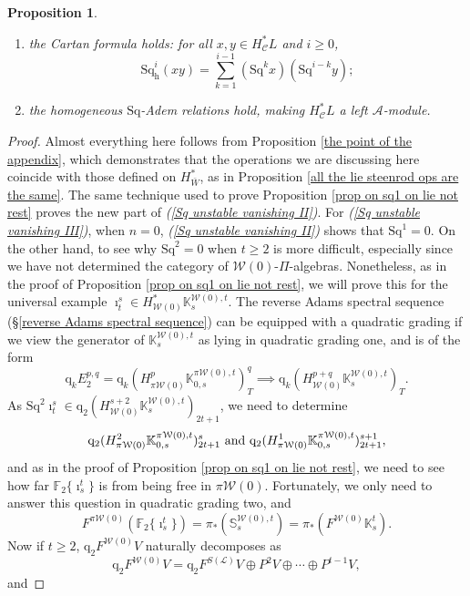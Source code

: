 \documentclass[11pt]{amsart} \renewcommand{\baselinestretch}{1.4}
\theoremstyle{plain}
\newtheorem{prop}[thm]{Proposition}
\theoremstyle{definition}
\newcommand{\scrL}{\mathscr{L}}
\newcommand{\calA}{\mathcal{A}}
\newcommand{\calw}{\mathcal{W}}
\newcommand{\calc}{\mathcal{C}}
\newcommand{\LieOperad}{{\scrL}}
\newcommand{\PA}[1]{\pi#1}
\newcommand{\quadgrad}[1]{\mathrm{q}_{#1}}
\newcommand{\Sq}{\mathrm{Sq}}
\newcommand{\LieSteen}{\calA}
\newcommand{\F}{\mathbb{F}}
\newcommand{\Ftwo}{\F_2}
\newcommand{\dhor}{_\mathrm{h}}
\newcommand{\Sqh}{\mathrm{Sq}\dhor}
\begin{document}
\begin{Cohomology Operations for W and U}
\begin{prop}
\begin{enumerate}
\item the \emph{Cartan formula} holds:  for all $x,y\in   H^*_{\calc}L$ and $i\geq0$,
\[\Sqh^i(xy)=\textstyle\sum_{k=1}^{i-1}(\Sq^kx)(\Sq^{i-k}y);\]
\item \label{yeah H is a Stmodule II} the  homogeneous $\Sq$-Adem relations hold, making $H^{*}_\calc L$ a left $\LieSteen$-module.
\end{enumerate}
\end{prop}
\begin{proof}
Almost everything here follows from Proposition \ref{the point of the appendix}, which demonstrates that the operations we are discussing here coincide with those defined on $H^*_{\bar{W}}$, as in Proposition \ref{all the lie steenrod ops are the same}. The same technique used to prove Proposition \ref{prop on sq1 on lie not rest} proves the new part of \emph{(\ref{Sq unstable vanishing II})}. For \emph{(\ref{Sq unstable vanishing III})},  when $n=0$, \emph{(\ref{Sq unstable vanishing II})} shows that $\Sq^1=0$. On the other hand, to see why $\Sq^2=0$ when $t\geq2$ is more difficult, especially since we have not determined the category of $\calw(0)$-$\Pi$-algebras. Nonetheless, as in the proof of Proposition \ref{prop on sq1 on lie not rest}, we will prove this for the universal example $\imath^s_t\in H^*_{\calw(0)}\mathbb{K}_s^{\calw(0),t}$. The reverse Adams spectral sequence (\S\ref{reverse Adams spectral sequence}) can be equipped with a quadratic grading if we view the generator of $\mathbb{K}_s^{\calw(0),t}$ as lying in quadratic grading one, and is of the form
\[\quadgrad{k}E_2^{p,q}=\quadgrad{k}(H^{p}_{\PA{\calw(0)}}\mathbb{K}_{0,s}^{\PA{\calw(0)},t})^{q}_{T}\implies \quadgrad{k}(H^{p+q}_{\calw(0)}\mathbb{K}_s^{\calw(0),t})_T.\]
As $\Sq^2\imath_t^s\in \quadgrad{2}(H^{s+2}_{\calw(0)}\mathbb{K}_s^{\calw(0),t})_{2t+1}$, we need to determine
\[
\quadgrad{2}(H^{2}_{\PA{\calw(0)}}\mathbb{K}_{0,s}^{\PA{\calw(0)},t})^{s}_{2t+1}\textup{ and }
\quadgrad{2}(H^{1}_{\PA{\calw(0)}}\mathbb{K}_{0,s}^{\PA{\calw(0)},t})^{s+1}_{2t+1},
\] 
and as in the proof of Proposition \ref{prop on sq1 on lie not rest}, we need to see how far $\Ftwo\{\imath^t_s\}$ is from being free in $\PA{\calw(0)}$. Fortunately, we only need to answer this question in quadratic grading two, and 
\[F^{\PA{\calw(0)}}(\Ftwo\{\imath^t_s\})=\pi_*(\mathbb{S}_s^{\calw(0),t})=\pi_*(F^{\calw(0)} \mathbb{K}^{t}_s).\]
Now if $t\geq2$, $\quadgrad{2}F^{\calw(0)}V$ naturally decomposes as 
\[\quadgrad{2}F^{\calw(0)}V=\quadgrad{2}F^{S(\LieOperad)}V\oplus P^2V\oplus\cdots \oplus P^{t-1}V,\]
and

\end{proof}
\end{Cohomology Operations for W and U}
\end{document}
